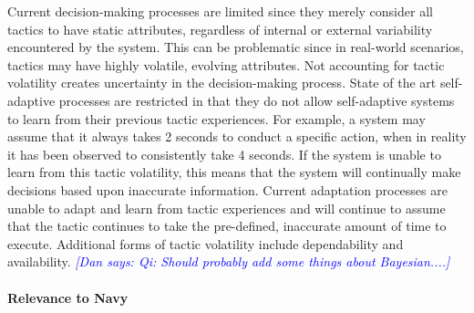 \documentclass[12pt]{article}
\newcommand{\dan}[1]{\textcolor{blue}{{\it [Dan says: #1]}}}
\begin{document}
Current decision-making processes are limited since they merely consider all tactics to have static attributes, regardless of internal or external variability encountered by the system. This can be problematic since in real-world scenarios, tactics may have highly volatile, evolving attributes. Not accounting for tactic volatility creates uncertainty in the decision-making process. State of the art self-adaptive processes are restricted in that they do not allow self-adaptive systems to learn from their previous tactic experiences. For example, a system may assume that it always takes 2 seconds to conduct a specific action, when in reality it has been observed to consistently take 4 seconds. If the system is unable to learn from this tactic volatility, this means that the system will continually make decisions based upon inaccurate information. Current adaptation processes are unable to adapt and learn from tactic experiences and will continue to assume that the tactic continues to take the pre-defined, inaccurate amount of time to execute. Additional forms of tactic volatility include dependability and availability. \dan{Qi: Should probably add some things about Bayesian....}



% 













\vspace{-0mm}\paragraph{Relevance to Navy} 
\end{document}
